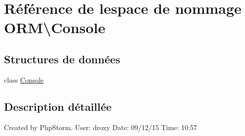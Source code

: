 \hypertarget{namespace_o_r_m_1_1_console}{}\section{Référence de l\textquotesingle{}espace de nommage O\+RM\textbackslash{}Console}
\label{namespace_o_r_m_1_1_console}
\subsection*{Structures de données}
\begin{DoxyCompactItemize}
\item 
class \hyperlink{class_o_r_m_1_1_console_1_1_console}{Console}
\end{DoxyCompactItemize}


\subsection{Description détaillée}
Created by Php\+Storm. User\+: droxy Date\+: 09/12/15 Time\+: 10\+:57 